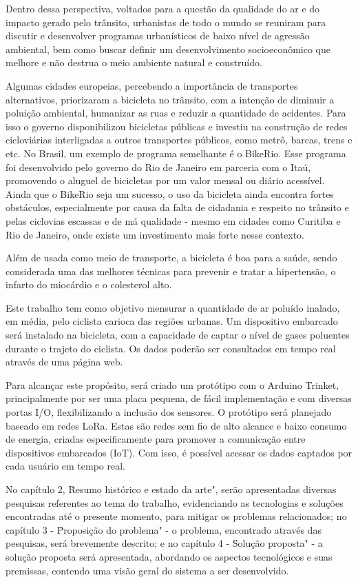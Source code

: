 Dentro dessa perspectiva, voltados para a questão da qualidade do ar e do impacto gerado pelo 
trânsito, urbanistas de todo o mundo se reuniram para discutir e desenvolver programas urbanísticos 
de baixo nível de agressão ambiental, bem como buscar definir um desenvolvimento socioeconômico que 
melhore e não destrua o meio ambiente natural e construído.

Algumas cidades europeias, percebendo a importância de transportes alternativos, priorizaram a 
bicicleta no trânsito, com a intenção de diminuir a poluição ambiental, humanizar as ruas e reduzir 
a quantidade de acidentes. Para isso o governo disponibilizou bicicletas públicas e investiu na 
construção de redes cicloviárias interligadas a outros transportes públicos, como metrô, barcas, 
trens e etc. No Brasil, um exemplo de programa semelhante é o BikeRio. Esse programa foi desenvolvido 
pelo governo do Rio de Janeiro em parceria com o Itaú, promovendo o aluguel de bicicletas por um 
valor mensal ou diário acessível. Ainda que o BikeRio seja um sucesso, o uso da bicicleta ainda 
encontra fortes obstáculos, especialmente por causa da falta de cidadania e respeito no trânsito e 
pelas ciclovias escassas e de má qualidade - mesmo em cidades como Curitiba e Rio de Janeiro, onde 
existe um investimento mais forte nesse contexto.

Além de usada como meio de transporte, a bicicleta é boa para a saúde, sendo considerada uma das 
melhores técnicas para prevenir e tratar a hipertensão, o infarto do miocárdio e o colesterol alto.

Este trabalho tem como objetivo mensurar a quantidade de ar poluído inalado, em média, pelo ciclista 
carioca das regiões urbanas. Um dispositivo embarcado será instalado na bicicleta, com a capacidade 
de captar o nível de gases poluentes durante o trajeto do ciclista. Os dados poderão ser consultados 
em tempo real através de uma página web.

Para alcançar este propósito, será criado um protótipo com o Arduino Trinket, principalmente por ser 
uma placa pequena, de fácil implementação e com diversas portas I/O, flexibilizando a inclusão dos 
sensores. O protótipo será planejado baseado em redes LoRa. Estas são redes sem fio de alto alcance 
e baixo consumo de energia, criadas especificamente para promover a comunicação entre dispositivos 
embarcados (IoT). Com isso, é possível acessar os dados captados por cada usuário em tempo real.

No capítulo 2, \"Resumo histórico e estado da arte", serão apresentadas diversas pesquisas referentes 
ao tema do trabalho, evidenciando as tecnologias e soluções encontradas até o presente momento, para 
mitigar os problemas relacionados; no capítulo 3 - \"Proposição do problema" - o problema, encontrado 
através das pesquisas, será brevemente descrito; e no capítulo 4 - \"Solução proposta" - a solução 
proposta será apresentada, abordando os aspectos tecnológicos e suas premissas, contendo uma visão 
geral do sistema a ser desenvolvido.

